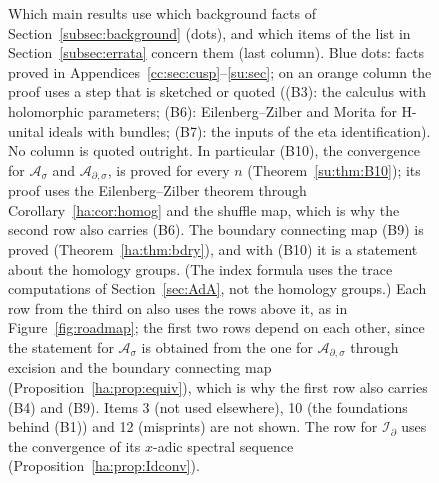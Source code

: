 \documentclass[11pt,oneside,reqno]{article}
\newcommand{\cA}{\mathcal A}
\newcommand{\cI}{\mathcal I}
\newcommand{\Is}{\mathcal I_\sigma}
\newcommand{\Id}{\mathcal I_\partial}
\newcommand{\As}{\mathcal A_\sigma}
\newcommand{\Ad}{\mathcal A_\partial}
\newcommand{\Ads}{\mathcal A_{\partial,\sigma}}
\theoremstyle{plain}
\theoremstyle{definition}
\theoremstyle{remark}
\begin{document}
\begin{figure}[htbp]
\centering
{}
\caption[Background facts and corrections used by the main results]{Which
main results use which background facts of
Section~\ref{subsec:background} (dots), and which items of the list in
Section~\ref{subsec:errata} concern them (last column). Blue dots: facts
proved in Appendices~\ref{cc:sec:cusp}--\ref{su:sec}; on an orange column
the proof uses a step that is sketched or quoted ((B3): the calculus with
holomorphic parameters; (B6): Eilenberg--Zilber and Morita for H-unital
ideals with bundles; (B7): the inputs of the eta identification). No
column is quoted outright. In particular (B10), the convergence for
\(\As\) and \(\Ads\), is proved for every \(n\)
(Theorem~\ref{su:thm:B10}); its proof uses the Eilenberg--Zilber theorem
through Corollary~\ref{ha:cor:homog} and the shuffle map, which is why
the second row also carries (B6). The boundary connecting map (B9) is
proved (Theorem~\ref{ha:thm:bdry}), and with (B10) it is a statement
about the homology groups. (The index formula uses the trace
computations of Section~\ref{sec:AdA}, not the homology groups.) Each row from the third on also uses the rows above it, as in
Figure~\ref{fig:roadmap}; the first two rows depend on each other, since
the statement for \(\As\) is obtained from the one for \(\Ads\) through
excision and the boundary connecting map
(Proposition~\ref{ha:prop:equiv}), which is why the first row also
carries (B4) and (B9). Items 3 (not
used elsewhere), 10 (the foundations behind (B1)) and 12 (misprints) are
not shown. The row for \(\Id\) uses the convergence of its \(x\)-adic
spectral sequence (Proposition~\ref{ha:prop:Idconv}).}
\label{fig:deps}
\end{figure}
\end{document}

